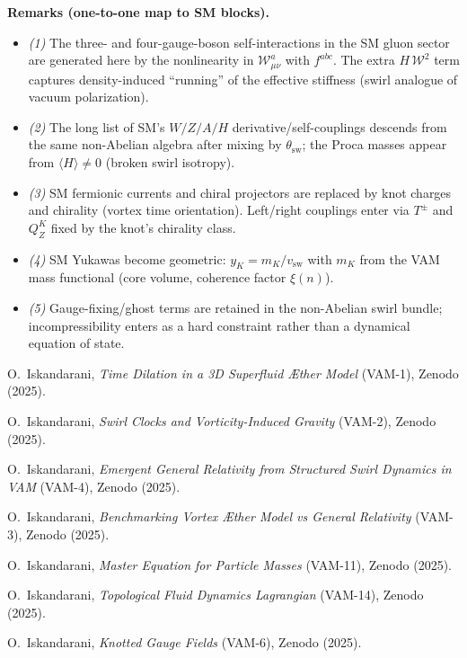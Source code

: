 \documentclass[11pt]{article}
\begin{document}
    \bigskip
    \noindent\textbf{Remarks (one-to-one map to SM blocks).}
    \begin{itemize}[leftmargin=1.2em]
        \item \emph{(1)} The three- and four-gauge-boson self-interactions in the SM gluon sector are generated here by the nonlinearity in \(\mathcal{W}^a_{\mu\nu}\) with \(f^{abc}\). The extra \(H\,\mathcal{W}^2\) term captures density-induced “running” of the effective stiffness (swirl analogue of vacuum polarization).
        \item \emph{(2)} The long list of SM’s \(W/Z/A/H\) derivative/self-couplings descends from the same non-Abelian algebra after mixing by \(\theta_\text{sw}\); the Proca masses appear from \(\langle H\rangle\neq 0\) (broken swirl isotropy).
        \item \emph{(3)} SM fermionic currents and chiral projectors are replaced by knot charges and chirality (vortex time orientation). Left/right couplings enter via \(T^\pm\) and \(Q_Z^K\) fixed by the knot’s chirality class.
        \item \emph{(4)} SM Yukawas become geometric: \(y_K=m_K/v_\text{sw}\) with \(m_K\) from the VAM mass functional (core volume, coherence factor \(\xi(n)\)).
        \item \emph{(5)} Gauge-fixing/ghost terms are retained in the non-Abelian swirl bundle; incompressibility enters as a hard constraint rather than a dynamical equation of state.
    \end{itemize}

    \begin{thebibliography}{9}
        O.~Iskandarani, \emph{Time Dilation in a 3D Superfluid \AE ther Model} (VAM-1), Zenodo (2025).

        O.~Iskandarani, \emph{Swirl Clocks and Vorticity-Induced Gravity} (VAM-2), Zenodo (2025).

        O.~Iskandarani, \emph{Emergent General Relativity from Structured Swirl Dynamics in VAM} (VAM-4), Zenodo (2025).

        O.~Iskandarani, \emph{Benchmarking Vortex \AE ther Model vs General Relativity} (VAM-3), Zenodo (2025).

        O.~Iskandarani, \emph{Master Equation for Particle Masses} (VAM-11), Zenodo (2025).

        O.~Iskandarani, \emph{Topological Fluid Dynamics Lagrangian} (VAM-14), Zenodo (2025).

        O.~Iskandarani, \emph{Knotted Gauge Fields} (VAM-6), Zenodo (2025).
    \end{thebibliography}
\end{document}
